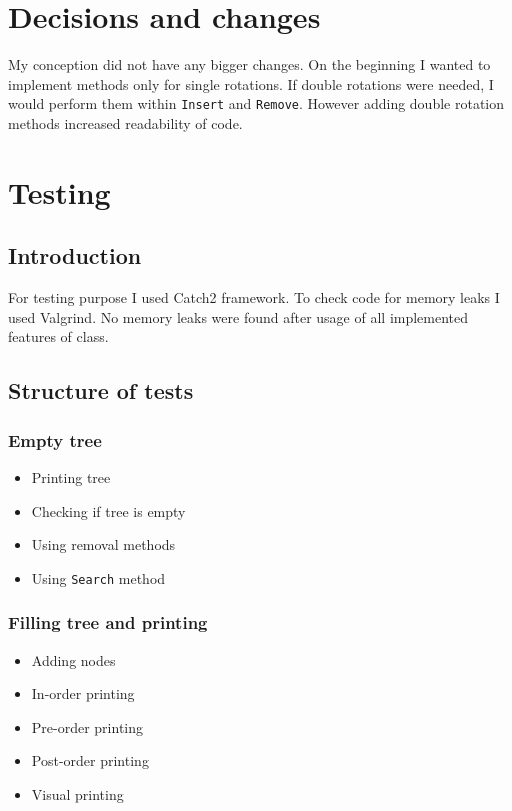 \documentclass{article}
\begin{document}
\section{Decisions and changes}

My conception did not have any bigger changes. On the beginning I wanted to implement
methods only for single rotations. If double rotations were needed, I would perform them
within {\tt Insert} and {\tt Remove}. However adding double rotation methods increased
readability of code.
\newpage

\section{Testing}

\subsection{Introduction}

For testing purpose I used Catch2 framework. To check code for memory leaks I used
Valgrind. No memory leaks were found after usage of all implemented features of class.

\subsection{Structure of tests}

\subsubsection*{Empty tree}

\begin{itemize}
    \item Printing tree
    \item Checking if tree is empty
    \item Using removal methods
    \item Using {\tt Search} method
\end{itemize}

\subsubsection*{Filling tree and printing}

\begin{itemize}
    \item Adding nodes
    \item In-order printing
    \item Pre-order printing
    \item Post-order printing
    \item Visual printing
\end{itemize}
\end{document}
